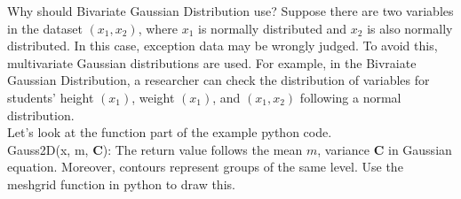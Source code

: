 \documentclass[letterpaper, 11pt]{article}
\renewcommand{\vec}[1]{\boldsymbol{\mathbf{#1}}}
\newcommand{\mat}[1]{\vec{#1}}
\begin{document}
Why should Bivariate Gaussian Distribution use? Suppose there are two variables in the dataset $(x_1, x_2)$, where $x_1$ is normally distributed and $x_2$ is also normally distributed. In this case, exception data may be wrongly judged. To avoid this, multivariate Gaussian distributions are used. For example, in the Bivraiate Gaussian Distribution, a researcher can check the distribution of variables for students' height $(x_1)$, weight $(x_1)$, and  $(x_1, x_2)$ following a normal distribution. \\
Let's look at the function part of the example python code.\\
Gauss2D(x, m, $\mat{C}$): The return value follows the mean $m$, variance $\mat{C}$ in Gaussian equation.
Moreover, contours represent groups of the same level. Use the meshgrid function in python to draw this.
\begin{figure}[h] %
\centering
{}

\end{figure}
\end{document}
